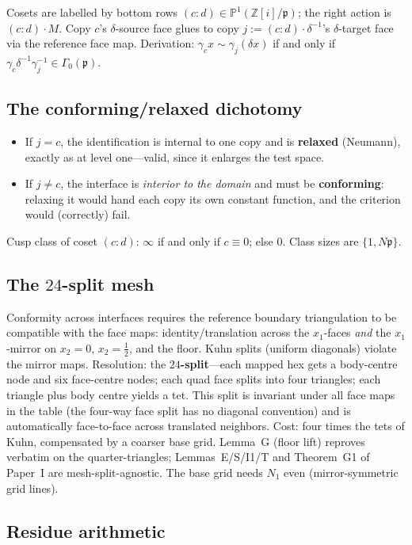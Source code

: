 \documentclass[11pt]{amsart}
\newcommand{\ZZ}{\mathbb{Z}}
\newcommand{\p}{\mathfrak{p}}
\begin{document}
Cosets are labelled by bottom rows $(c:d)\in\mathbb{P}^1(\ZZ[i]/\p)$; the
right action is $(c:d)\cdot M$.  Copy $c$'s $\delta$-source face glues to
copy $j:=(c:d)\cdot\delta^{-1}$'s $\delta$-target face via the reference
face map.  Derivation: $\gamma_c x\sim\gamma_j(\delta x)$ if and only if
$\gamma_c\delta^{-1}\gamma_j^{-1}\in\Gamma_0(\p)$.

\subsection{The conforming/relaxed dichotomy}

\begin{itemize}
\item If $j=c$, the identification is internal to one copy and is
  \textbf{relaxed} (Neumann), exactly as at level one---valid, since it
  enlarges the test space.
\item If $j\neq c$, the interface is \emph{interior to the domain} and
  must be \textbf{conforming}: relaxing it would hand each copy its own
  constant function, and the criterion would (correctly) fail.
\end{itemize}
Cusp class of coset $(c:d)$: $\infty$ if and only if $c\equiv 0$; else
$0$.  Class sizes are $\{1,N\p\}$.

\subsection{The $24$-split mesh}

Conformity across interfaces requires the reference boundary
triangulation to be compatible with the face maps: identity/translation
across the $x_1$-faces \emph{and} the $x_1$-mirror on $x_2=0$,
$x_2=\tfrac12$, and the floor.  Kuhn splits (uniform diagonals) violate
the mirror maps.  Resolution: the \textbf{$24$-split}---each mapped hex
gets a body-centre node and six face-centre nodes; each quad face splits
into four triangles; each triangle plus body centre yields a tet.  This
split is invariant under all face maps in the table (the four-way face
split has no diagonal convention) and is automatically face-to-face
across translated neighbors.  Cost: four times the tets of Kuhn,
compensated by a coarser base grid.  Lemma~G (floor lift) reproves
verbatim on the quarter-triangles; Lemmas~E/S/I1/T and Theorem~G1 of
Paper~I are mesh-split-agnostic.  The base grid needs $N_1$ even
(mirror-symmetric grid lines).

\subsection{Residue arithmetic}
\end{document}
